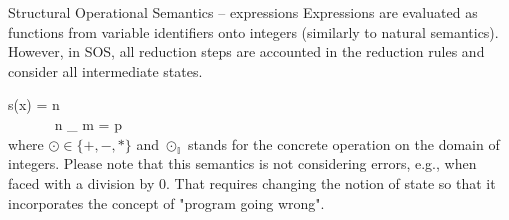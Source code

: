 \documentclass[aspectratio=169]{beamer}
\begin{document}
\begin{slide}{Structural Operational Semantics -- expressions}
\small 
Expressions are evaluated as functions from variable identifiers onto integers (similarly to natural semantics). However, in SOS, all reduction steps are accounted in the reduction rules and consider all intermediate states.

\centering
\newcommand{\msep}{~~~~~~}

%
  {s(x) = n}%
  { \Longrightarrow {}}
\msep %
%
  {\Longrightarrow {}}%
  { \Longrightarrow {}}
\\[5mm]
%
  { \Longrightarrow {}}%
  { \Longrightarrow {}}
\msep %
%
  {n \odot_{} m = p \in {}}%
  { \Longrightarrow {}}
\\[5mm]
\flushleft 
where $\odot \in \{+,-,*\}$ and $\odot_\mathbb{I}$ stands for the concrete operation on the domain of integers. Please note that this semantics is not considering errors, e.g., when faced with a division by 0. That requires changing the notion of state so that it incorporates the concept of "program going wrong".
\end{slide}
\end{document}
